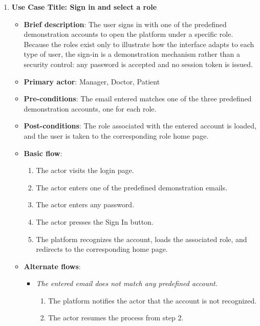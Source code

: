 \begin{enumerate}
\vspace{0.5em}

\item \textbf{Use Case Title: Sign in and select a role}
\begin{itemize}
    \item \textbf{Brief description}: The user signs in with one of the predefined demonstration accounts to open the platform under a specific role. Because the roles exist only to illustrate how the interface adapts to each type of user, the sign-in is a demonstration mechanism rather than a security control: any password is accepted and no session token is issued.
    \item \textbf{Primary actor}: Manager, Doctor, Patient
    \item \textbf{Pre-conditions}: The email entered matches one of the three predefined demonstration accounts, one for each role.
    \item \textbf{Post-conditions}: The role associated with the entered account is loaded, and the user is taken to the corresponding role home page.
    \item \textbf{Basic flow}:
    \begin{enumerate}
        \item The actor visits the login page.
        \item The actor enters one of the predefined demonstration emails.
        \item The actor enters any password.
        \item The actor presses the Sign In button.
        \item The platform recognizes the account, loads the associated role, and redirects to the corresponding home page.
    \end{enumerate}
    \item \textbf{Alternate flows}:
    \begin{itemize}
        \item[2a.] \textit{The entered email does not match any predefined account.}
        \begin{enumerate}
            \item The platform notifies the actor that the account is not recognized.
            \item The actor resumes the process from step 2.
        \end{enumerate}
    \end{itemize}
\end{itemize}


\end{enumerate}

